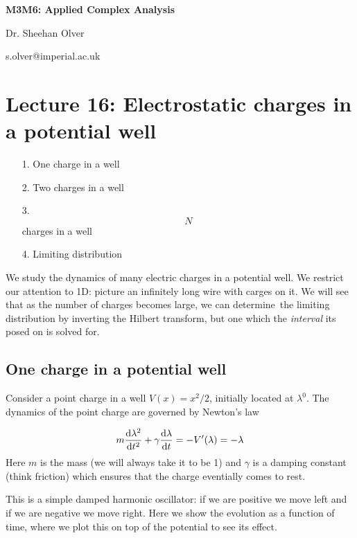 \documentclass[12pt,a4paper]{article}
\def\D{ {\rm d} }
\def\dt{\D t}
\begin{document}
\textbf{M3M6: Applied Complex Analysis}

Dr. Sheehan Olver

s.olver@imperial.ac.uk

\section{Lecture 16: Electrostatic charges in a potential well}
\begin{itemize}
\item[1. ] One charge in a well


\item[2. ] Two charges in a well


\item[3. ] \[
N
\]
charges in a well


\item[4. ] Limiting distribution

\end{itemize}
We study the dynamics of many electric charges in a potential well.  We restrict our attention to 1D:  picture an infinitely long wire with carges on it. We will see that as the number of charges becomes large,  we can determine the limiting distribution by inverting the Hilbert transform, but one which the \emph{interval}  its posed on is solved for.

\subsection{One charge in a potential well}
Consider a point charge in a well $V(x) = x^2 / 2$, initially located at $\lambda^0$.  The dynamics of the point charge are governed by Newton's law

\[
m { \D \lambda^2 \over \dt^2} + \gamma { \D \lambda \over \dt}  = -V'(\lambda) = -  \lambda
\]
Here $m$ is the mass (we will always take it to be 1) and $\gamma$ is a damping constant (think friction) which ensures that the charge eventially comes to  rest. 

This is a simple damped harmonic oscillator: if we are positive we move left and if we are negative we move right.  Here we show the evolution as a function of time, where we plot this on top of the potential to see its effect.
\end{document}
